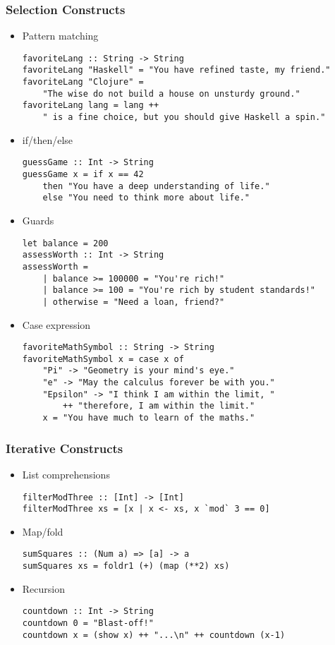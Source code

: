 \documentclass[titlepage,12pt]{article}
\newcommand{\bi}{\begin{itemize}}
\newcommand{\ei}{\end{itemize}}
\begin{document}
\subsubsection{Selection Constructs}
\bi
    \item Pattern matching
\begin{verbatim}
favoriteLang :: String -> String
favoriteLang "Haskell" = "You have refined taste, my friend."
favoriteLang "Clojure" = 
    "The wise do not build a house on unsturdy ground."
favoriteLang lang = lang ++ 
    " is a fine choice, but you should give Haskell a spin."
\end{verbatim}
    \item if/then/else
\begin{verbatim}
guessGame :: Int -> String
guessGame x = if x == 42
    then "You have a deep understanding of life."
    else "You need to think more about life."
\end{verbatim}
    \item Guards
\begin{verbatim}
let balance = 200
assessWorth :: Int -> String
assessWorth =
    | balance >= 100000 = "You're rich!"
    | balance >= 100 = "You're rich by student standards!"
    | otherwise = "Need a loan, friend?"
\end{verbatim}
    \item Case expression
\begin{verbatim}
favoriteMathSymbol :: String -> String
favoriteMathSymbol x = case x of
    "Pi" -> "Geometry is your mind's eye."
    "e" -> "May the calculus forever be with you."
    "Epsilon" -> "I think I am within the limit, "
        ++ "therefore, I am within the limit."
    x = "You have much to learn of the maths."
\end{verbatim}
\ei

\subsubsection{Iterative Constructs}
\bi
    \item List comprehensions
\begin{verbatim}
filterModThree :: [Int] -> [Int]
filterModThree xs = [x | x <- xs, x `mod` 3 == 0]
\end{verbatim}
    \item Map/fold
\begin{verbatim}
sumSquares :: (Num a) => [a] -> a
sumSquares xs = foldr1 (+) (map (**2) xs)
\end{verbatim}
    \item Recursion
\begin{verbatim}
countdown :: Int -> String
countdown 0 = "Blast-off!"
countdown x = (show x) ++ "...\n" ++ countdown (x-1)
\end{verbatim}
\ei
\end{document}
